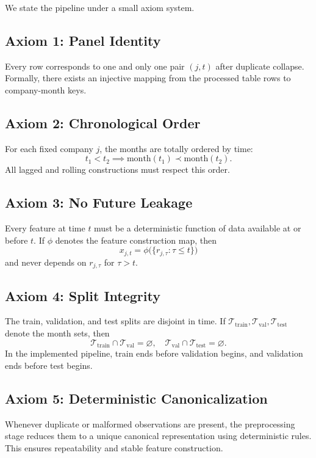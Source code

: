 \documentclass[11pt]{article}
\newcommand{\1}{\mathbf{1}}
\newcommand{\T}{\mathcal{T}}
\begin{document}
We state the pipeline under a small axiom system.

\subsection{Axiom 1: Panel Identity}

Every row corresponds to one and only one pair $(j,t)$ after duplicate collapse. Formally, there exists an injective mapping from the processed table rows to company-month keys.

\subsection{Axiom 2: Chronological Order}

For each fixed company $j$, the months are totally ordered by time:
\[
t_1 < t_2 \implies \text{month}(t_1) \prec \text{month}(t_2).
\]
All lagged and rolling constructions must respect this order.

\subsection{Axiom 3: No Future Leakage}

Every feature at time $t$ must be a deterministic function of data available at or before $t$. If $\phi$ denotes the feature construction map, then
\[
x_{j,t} = \phi\big(\{r_{j,\tau} : \tau \le t\}\big)
\]
and never depends on $r_{j,\tau}$ for $\tau > t$.

\subsection{Axiom 4: Split Integrity}

The train, validation, and test splits are disjoint in time. If $\T_{\mathrm{train}}, \T_{\mathrm{val}}, \T_{\mathrm{test}}$ denote the month sets, then
\[
\T_{\mathrm{train}} \cap \T_{\mathrm{val}} = \varnothing,\quad
\T_{\mathrm{val}} \cap \T_{\mathrm{test}} = \varnothing.
\]
In the implemented pipeline, train ends before validation begins, and validation ends before test begins.

\subsection{Axiom 5: Deterministic Canonicalization}

Whenever duplicate or malformed observations are present, the preprocessing stage reduces them to a unique canonical representation using deterministic rules. This ensures repeatability and stable feature construction.
\end{document}
